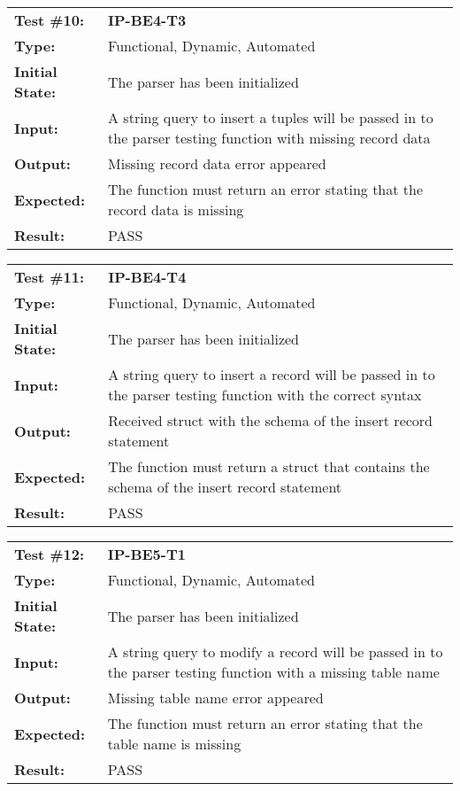 \documentclass[12pt, titlepage]{article}
\begin{document}
\begin{mdframed}[linewidth=1pt]
\begin{tabularx}{\textwidth}{@{}p{3cm}X@{}}
{\bf Test \#10:} & {\bf IP-BE4-T3}\\[\baselineskip]
{\bf Type:} & Functional, Dynamic, Automated \\[0.5\baselineskip]
{\bf Initial State:} & The parser has been initialized \\[\baselineskip]
{\bf Input:} & A string query to insert a tuples will be passed in to the parser testing function with missing record data \\[\baselineskip]
{\bf Output:} & Missing record data error appeared \\[\baselineskip]
{\bf Expected:} & The function must return an error stating that the record data is missing \\[\baselineskip]
{\bf Result:} & PASS
\end{tabularx}
\end{mdframed}

\begin{mdframed}[linewidth=1pt]
\begin{tabularx}{\textwidth}{@{}p{3cm}X@{}}
{\bf Test \#11:} & {\bf IP-BE4-T4}\\[\baselineskip]
{\bf Type:} & Functional, Dynamic, Automated \\[0.5\baselineskip]
{\bf Initial State:} & The parser has been initialized \\[\baselineskip]
{\bf Input:} & A string query to insert a record will be passed in to the parser testing function with the correct syntax \\[\baselineskip]
{\bf Output:} & Received struct with the schema of the insert record statement \\[\baselineskip]
{\bf Expected:} & The function must return a struct that contains the schema of the insert record statement \\[\baselineskip]
{\bf Result:} & PASS
\end{tabularx}
\end{mdframed}

\begin{mdframed}[linewidth=1pt]
\begin{tabularx}{\textwidth}{@{}p{3cm}X@{}}
{\bf Test \#12:} & {\bf IP-BE5-T1}\\[\baselineskip]
{\bf Type:} & Functional, Dynamic, Automated \\[0.5\baselineskip]
{\bf Initial State:} & The parser has been initialized \\[\baselineskip]
{\bf Input:} & A string query to modify a record will be passed in to the parser testing function with a missing table name \\[\baselineskip]
{\bf Output:} & Missing table name error appeared \\[\baselineskip]
{\bf Expected:} & The function must return an error stating that the table name is missing \\[\baselineskip]
{\bf Result:} & PASS
\end{tabularx}
\end{mdframed}
\end{document}
